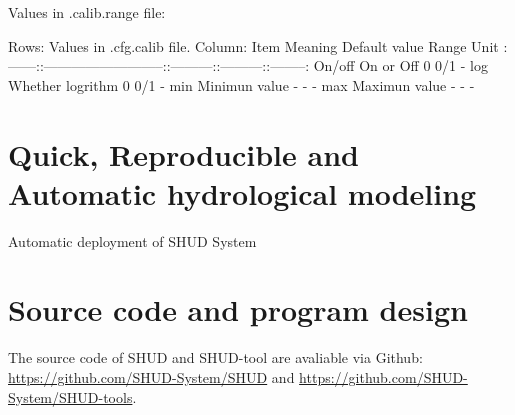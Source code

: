 \documentclass[]{scrbook}
\begin{document}
Values in .calib.range file:

Rows: Values in .cfg.calib file. Column: \textbar{} Item \textbar{}
Meaning \textbar{} Default value \textbar{} Range \textbar{} Unit
\textbar{}
\textbar{}:------:\textbar{}:--------------------------:\textbar{}:---------:\textbar{}:---------:\textbar{}:--------:\textbar{}
\textbar{} On/off \textbar{} On or Off \textbar{} 0 \textbar{} 0/1
\textbar{} - \textbar{} \textbar{} log \textbar{} Whether logrithm
\textbar{} 0 \textbar{} 0/1 \textbar{} - \textbar{} \textbar{} min
\textbar{} Minimun value \textbar{} - \textbar{} - \textbar{} -
\textbar{} \textbar{} max \textbar{} Maximun value \textbar{} -
\textbar{} - \textbar{} - \textbar{}

\chapter{Quick, Reproducible and Automatic hydrological
modeling}\label{quick-reproducible-and-automatic-hydrological-modeling}

Automatic deployment of SHUD System

\chapter{Source code and program
design}\label{source-code-and-program-design}

The source code of SHUD and SHUD-tool are avaliable via Github:
\url{https://github.com/SHUD-System/SHUD} and
\url{https://github.com/SHUD-System/SHUD-tools}.


\end{document}
